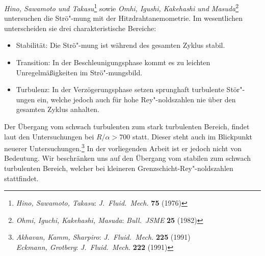 \documentclass[10pt,a5paper,oneside,draft]{book}
\numberwithin{equation}{chapter}
\def\bibspace{\hspace*{18pt}}
\def\bibspace{\hspace*{21pt}}
\begin{document}
\textsl{Hino, Sawamoto und Takasu}\footnote{\label{bib:hino_sawamoto}\textsl{Hino, Sawamoto, Takasu}: \textit{J.\ Fluid.\ Mech.} \textbf{75} (1976)}
sowie \textsl{Omhi, Igushi, Kakehashi und Masuda}\footnote{\label{bib:ohmi_igushi}\textsl{Ohmi, Iguchi, Kakehashi, Masuda}: \textit{Bull.\ JSME} \textbf{25} (1982)}
untersuchen die Str\"o"-mung mit der Hitzdrahtanemometrie.
Im wesentlichen unterscheiden sie drei charakteristische Bereiche:
\begin{itemize}
	\item Stabilit\"at: Die Str\"o"-mung ist w\"ahrend des gesamten Zyklus stabil.
	\item Transition: In der Beschleunigungsphase kommt es zu leichten Unregelm\"a\ss igkeiten im Str\"o"-mungsbild.
	\item Turbulenz: In der Verz\"ogerungsphase setzen sprunghaft turbulente St\"or"-ungen ein, welche jedoch auch f\"ur hohe Rey"-noldszahlen nie \"uber den gesamten Zyklus anhalten.
\end{itemize}
Der \"Ubergang vom schwach turbulenten zum stark turbulenten Bereich, findet laut den Untersuchungen bei $R/\alpha > 700$ statt.
Dieser steht auch im Blickpunkt neuerer Untersuchungen.\footnote{\label{bib:akhavan1}\textsl{Akhavan, Kamm, Sharpiro}: \textit{J.\ Fluid.\ Mech.} \textbf{225} (1991)\\\bibspace\label{bib:eckmann_grotberg}\textsl{Eckmann, Grotberg}: \textit{J.\ Fluid.\ Mech.} \textbf{222} (1991)}
In der vorliegenden Arbeit ist er jedoch nicht von Bedeutung.
Wir beschr\"anken uns auf den \"Ubergang vom stabilen zum schwach turbulenten Bereich, welcher bei kleineren Grenzschicht-Rey"-noldszahlen stattfindet.\\
\end{document}
